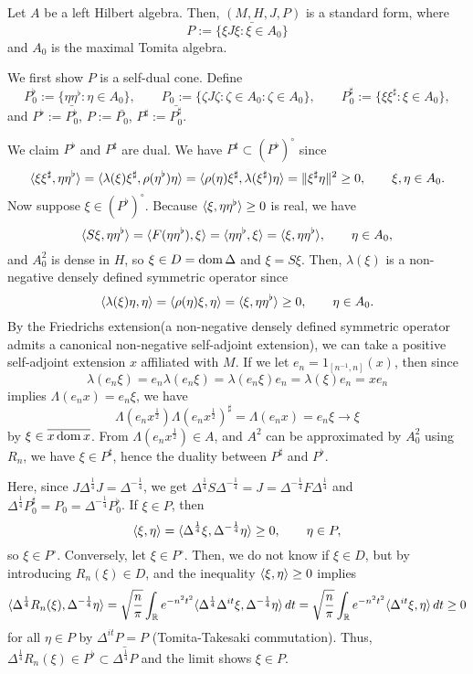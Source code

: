 \documentclass{../../../small}
\begin{document}
\begin{prop}[Existence]
Let $A$ be a left Hilbert algebra.
Then, $(M,H,J,P)$ is a standard form, where
\[P:=\bar{\{\xi J\xi:\xi\in A_0\}}\]
and $A_0$ is the maximal Tomita algebra.
\end{prop}
\begin{pf}
We first show $P$ is a self-dual cone.
Define
\[P_0^\flat:=\{\eta\eta^\flat:\eta\in A_0\},\qquad P_0:=\{\zeta J\zeta:\zeta\in A_0:\zeta\in A_0\},\qquad P_0^\sharp:=\{\xi\xi^\sharp:\xi\in A_0\},\]
and $P^\flat:=\bar{P_0^\flat}$, $P:=\bar{P_0}$, $P^\sharp:=\bar{P_0^\sharp}$.

We claim $P^\flat$ and $P^\sharp$ are dual.
We have $P^\sharp\subset(P^\flat)^\circ$ since
\[\langle\xi\xi^\sharp,\eta\eta^\flat\rangle=\langle\lambda(\xi)\xi^\sharp,\rho(\eta^\flat)\eta\rangle=\langle\rho(\eta)\xi^\sharp,\lambda(\xi^\sharp)\eta\rangle=\|\xi^\sharp\eta\|^2\ge0,\qquad\xi,\eta\in A_0.\]
Now suppose $\xi\in(P^\flat)^\circ$.
Because $\langle\xi,\eta\eta^\flat\rangle\ge0$ is real, we have
\[\langle S\xi,\eta\eta^\flat\rangle=\langle F(\eta\eta^\flat),\xi\rangle=\langle\eta\eta^\flat,\xi\rangle=\langle\xi,\eta\eta^\flat\rangle,\qquad\eta\in A_0,\]
and $A_0^2$ is dense in $H$, so $\xi\in D=\operatorname{dom}\Delta$ and $\xi=S\xi$.
Then, $\lambda(\xi)$ is a non-negative densely defined symmetric operator since
\[\langle\lambda(\xi)\eta,\eta\rangle=\langle\rho(\eta)\xi,\eta\rangle=\langle\xi,\eta\eta^\flat\rangle\ge0,\qquad\eta\in A_0.\]
By the Friedrichs extension(a non-negative densely defined symmetric operator admits a canonical non-negative self-adjoint extension), we can take a positive self-adjoint extension $x$ affiliated with $M$.
If we let $e_n=1_{[n^{-1},n]}(x)$, then since
\[\lambda(e_n\xi)=e_n\lambda(e_n\xi)=\lambda(e_n\xi)e_n=\lambda(\xi)e_n=xe_n\]
implies $\Lambda(e_nx)=e_n\xi$, we have
\[\Lambda(e_nx^{\frac12})\Lambda(e_nx^{\frac12})^\sharp=\Lambda(e_nx)=e_n\xi\to\xi\]
by $\xi\in\overline{x\operatorname{dom} x}$.
From $\Lambda(e_nx^{\frac12})\in A$, and $A^2$ can be approximated by $A_0^2$ using $R_n$, we have $\xi\in P^\sharp$, hence the duality between $P^\sharp$ and $P^\flat$.

Here, since $J\Delta^{\frac14}J=\Delta^{-\frac14}$, we get $\Delta^{\frac14}S\Delta^{-\frac14}=J=\Delta^{-\frac14}F\Delta^{\frac14}$ and $\Delta^{\frac14}P_0^\sharp=P_0=\Delta^{-\frac14}P_0^\flat$.
If $\xi\in P$, then
\[\langle\xi,\eta\rangle=\langle\Delta^{\frac14}\xi,\Delta^{-\frac14}\eta\rangle\ge0,\qquad\eta\in P,\]
so $\xi\in P^\circ$.
Conversely, let $\xi\in P^\circ$.
Then, we do not know if $\xi\in D$, but by introducing $R_n(\xi)\in D$, and the inequality $\langle\xi,\eta\rangle\ge0$ implies
\[\langle\Delta^{\frac14}R_n(\xi),\Delta^{-\frac14}\eta\rangle=\sqrt{\frac n\pi}\int_{\mathbb{R}} e^{-n^2t^2}\langle\Delta^{\frac14}\Delta^{it}\xi,\Delta^{-\frac14}\eta\rangle\,dt=\sqrt{\frac n\pi}\int_{\mathbb{R}} e^{-n^2t^2}\langle\Delta^{it}\xi,\eta\rangle\,dt\ge0\]
for all $\eta\in P$ by $\Delta^{it}P=P$ (Tomita-Takesaki commutation).
Thus, $\Delta^{\frac14}R_n(\xi)\in P^\flat\subset\bar{\Delta^{\frac14}P}$ and the limit shows $\xi\in P$.


\end{pf}
\end{document}
